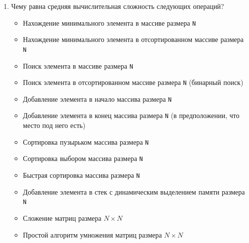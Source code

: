 \documentclass{article}
\begin{document}
\begin{enumerate}
\item \textbf{} Чему равна средняя вычислительная сложность следующих операций?
\begin{itemize}
\item Нахождение минимального элемента в массиве размера \texttt{N}
\item Нахождение минимального элемента в отсортированном массиве размера \texttt{N}
\item Поиск элемента в массиве размера \texttt{N}
\item Поиск элемента в отсортированном массиве размера \texttt{N} (бинарный поиск)
\item Добавление элемента в начало массива размера \texttt{N}
\item Добавление элемента в конец массива размера \texttt{N} (в предположении, что место под него есть)
\item Сортировка пузырьком массива размера \texttt{N}
\item Сортировка выбором массива размера \texttt{N}
\item Быстрая сортировка массива размера \texttt{N}
\item Добавление элемента в стек с динамическим выделением памяти размера \texttt{N}
\item Сложение матриц размера  $N \times N$
\item Простой алгоритм умножения матриц размера  $N \times N$
\end{itemize}
\end{enumerate}

\newpage
\end{document}
